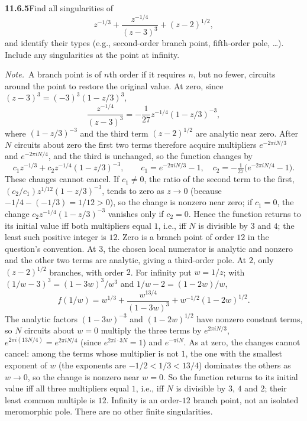 \par\bigskip
\noindent\textbf{11.6.5}\quad Find all singularities of
\[
z^{-1/3}+\frac{z^{-1/4}}{(z-3)^{3}}+(z-2)^{1/2},
\]
and identify their types (e.g., second-order branch point, fifth-order pole,
\ldots). Include any singularities at the point at infinity.

\emph{Note.}~A branch point is of $n$th order if it requires $n$, but no
fewer, circuits around the point to restore the original value.
\solution
At zero, since $(z-3)^3=(-3)^3(1-z/3)^3$,
\[
\frac{z^{-1/4}}{(z-3)^3}
=-\frac1{27}z^{-1/4}(1-z/3)^{-3},
\]
where $(1-z/3)^{-3}$ and the third term $(z-2)^{1/2}$ are analytic
near zero. After $N$ circuits about zero the first two terms therefore
acquire multipliers $e^{-2\pi iN/3}$ and $e^{-2\pi iN/4}$, and the third
is unchanged, so the function changes by
\[
c_1z^{-1/3}+c_2z^{-1/4}(1-z/3)^{-3},\qquad
c_1=e^{-2\pi iN/3}-1,\quad c_2=-\tfrac1{27}\bigl(e^{-2\pi iN/4}-1\bigr).
\]
These changes cannot cancel. If $c_1\ne0$, the ratio of the second term
to the first, $(c_2/c_1)z^{1/12}(1-z/3)^{-3}$, tends to zero as $z\to0$
(because $-1/4-(-1/3)=1/12>0$), so the change is nonzero near zero; if
$c_1=0$, the change $c_2z^{-1/4}(1-z/3)^{-3}$ vanishes only if $c_2=0$.
Hence the function returns to its initial value iff both multipliers
equal $1$, i.e., iff $N$ is divisible by $3$ and $4$;
the least such positive integer is $12$. Zero is a branch point
of order $12$ in the question's convention.
At $3$, the chosen local numerator is analytic and nonzero and the
other two terms are analytic, giving a third-order pole. At $2$, only $(z-2)^{1/2}$ branches, with order $2$.
For infinity put $w=1/z$; with $(1/w-3)^3=(1-3w)^3/w^3$ and
$1/w-2=(1-2w)/w$,
\[
f(1/w)=w^{1/3}+\frac{w^{13/4}}{(1-3w)^3}
+w^{-1/2}(1-2w)^{1/2}.
\]
The analytic factors $(1-3w)^{-3}$ and $(1-2w)^{1/2}$ have nonzero
constant terms, so $N$ circuits about $w=0$ multiply the three terms by
$e^{2\pi iN/3}$, $e^{2\pi i(13N/4)}=e^{2\pi iN/4}$ (since
$e^{2\pi i\cdot3N}=1$) and $e^{-\pi iN}$. As at zero, the changes
cannot cancel: among the terms whose multiplier is not $1$, the one with
the smallest exponent of $w$ (the exponents are $-1/2<1/3<13/4$)
dominates the others as $w\to0$, so the change is nonzero near $w=0$.
So the function returns to its initial value iff all three multipliers
equal $1$, i.e., iff $N$ is divisible by $3$, $4$ and $2$; their least
common multiple is $12$.
Infinity is an order-$12$ branch point, not an isolated meromorphic pole.
There are no other finite singularities.

